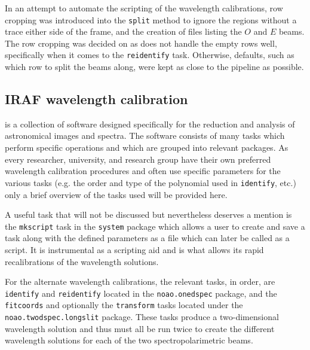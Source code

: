 In an attempt to automate the scripting of the \iraf wavelength calibrations, row cropping was introduced into the \texttt{split} method to ignore the regions without a trace either side of the frame, and the creation of files listing the $O$ and $E$ beams. The row cropping was decided on as \iraf does not handle the empty rows well, specifically when it comes to the \texttt{reidentify} task. Otherwise, defaults, such as which row to split the beams along, were kept as close to the \polsalt pipeline as possible.


\subsection{IRAF wavelength calibration}\label{subsec:IRAF_wav_cal}

\iraf is a collection of software designed specifically for the reduction and analysis of astronomical images and spectra. The software consists of many tasks which perform specific operations and which are grouped into relevant packages. As every researcher, university, and research group have their own preferred wavelength calibration procedures and often use specific parameters for the various \iraf tasks (e.g. the order and type of the polynomial used in \texttt{identify}, etc.) only a brief overview of the tasks used will be provided here.
\prgph

A useful \iraf task that will not be discussed but nevertheless deserves a mention is the \texttt{mkscript} task in the \texttt{system} package which allows a user to create and save a task along with the defined parameters as a file which can later be called as a script. It is instrumental as a scripting aid and is what allows \iraf its rapid recalibrations of the wavelength solutions.
\prgph

For the alternate wavelength calibrations, the relevant tasks, in order, are \texttt{identify} and \texttt{reidentify} located in the \texttt{noao.onedspec} package, and the \texttt{fitcoords} and optionally the \texttt{transform} tasks located under the \texttt{noao.twodspec.longslit} package. These tasks produce a two-dimensional wavelength solution and thus must all be run twice to create the different wavelength solutions for each of the two spectropolarimetric beams.

